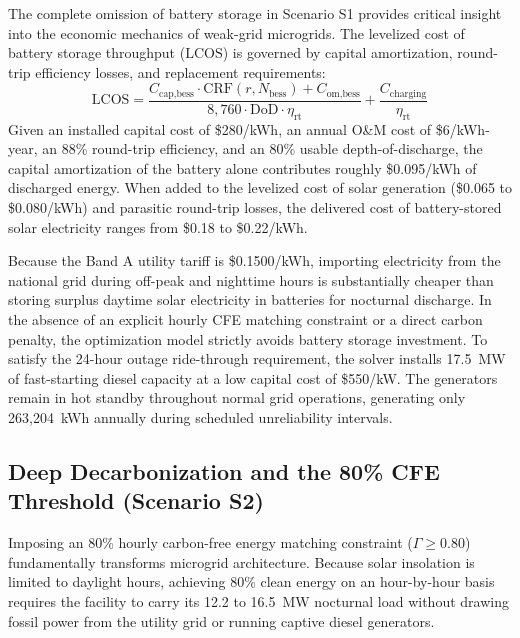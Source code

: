 \documentclass[11pt,a4paper]{article}
\begin{document}
The complete omission of battery storage in Scenario S1 provides critical insight into the economic mechanics of weak-grid microgrids. The levelized cost of battery storage throughput ($\text{LCOS}$) is governed by capital amortization, round-trip efficiency losses, and replacement requirements:
\begin{equation}
\text{LCOS} = \frac{C_{\text{cap,bess}} \cdot \text{CRF}(r, N_{\text{bess}}) + C_{\text{om,bess}}}{8,760 \cdot \text{DoD} \cdot \eta_{\text{rt}}} + \frac{C_{\text{charging}}}{\eta_{\text{rt}}}
\end{equation}
Given an installed capital cost of \$280/kWh, an annual O\&M cost of \$6/kWh-year, an 88\% round-trip efficiency, and an 80\% usable depth-of-discharge, the capital amortization of the battery alone contributes roughly \$0.095/kWh of discharged energy. When added to the levelized cost of solar generation (\$0.065 to \$0.080/kWh) and parasitic round-trip losses, the delivered cost of battery-stored solar electricity ranges from \$0.18 to \$0.22/kWh.

Because the Band A utility tariff is \$0.1500/kWh, importing electricity from the national grid during off-peak and nighttime hours is substantially cheaper than storing surplus daytime solar electricity in batteries for nocturnal discharge. In the absence of an explicit hourly CFE matching constraint or a direct carbon penalty, the optimization model strictly avoids battery storage investment. To satisfy the 24-hour outage ride-through requirement, the solver installs 17.5~MW of fast-starting diesel capacity at a low capital cost of \$550/kW. The generators remain in hot standby throughout normal grid operations, generating only 263,204~kWh annually during scheduled unreliability intervals.

\subsection{Deep Decarbonization and the 80\% CFE Threshold (Scenario S2)}
\label{subsec:results_s2}

Imposing an 80\% hourly carbon-free energy matching constraint ($\Gamma \ge 0.80$) fundamentally transforms microgrid architecture. Because solar insolation is limited to daylight hours, achieving 80\% clean energy on an hour-by-hour basis requires the facility to carry its 12.2 to 16.5~MW nocturnal load without drawing fossil power from the utility grid or running captive diesel generators.
\end{document}
